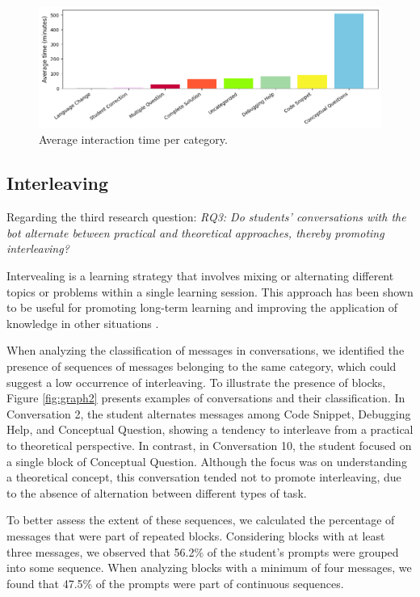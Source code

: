 \documentclass[a4paper,twoside]{article}
\begin{document}
\begin{figure}[htbp]
  \centering
  \includegraphics[scale=0.55]{img/figure3.png}
  \caption{Average interaction time per category.}
  \label{fig:graph3}
\end{figure}

\subsection{Interleaving}


Regarding the third research question: \textit{RQ3: Do students' conversations
with the bot alternate between practical and theoretical approaches, thereby
promoting interleaving?}

Intervealing is a learning strategy that involves mixing or alternating
different topics or problems within a single learning session. This approach has
been shown to be useful for promoting long-term learning and improving the
application of knowledge in other situations \citep{Rivers21}.

When analyzing the classification of messages in conversations, we identified
the presence of sequences of messages belonging to the same category, which
could suggest a low occurrence of interleaving. To illustrate the presence of
blocks, Figure \ref{fig:graph2} presents examples of conversations and their
classification. In Conversation 2, the student alternates messages among Code
Snippet, Debugging Help, and Conceptual Question, showing a tendency to
interleave from a practical to theoretical perspective. In contrast, in
Conversation 10, the student focused on a single block of Conceptual Question.
Although the focus was on understanding a theoretical concept, this conversation
tended not to promote interleaving, due to the absence of alternation between
different types of task.

To better assess the extent of these sequences, we calculated the percentage of
messages that were part of repeated blocks. Considering blocks with at least
three messages, we observed that 56.2\% of the student's prompts were grouped
into some sequence. When analyzing blocks with a minimum of four messages, we
found that 47.5\% of the prompts were part of continuous sequences.
\end{document}
